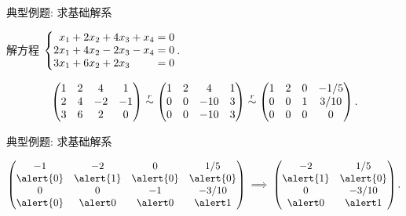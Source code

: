 \begin{frame}{典型例题: 求基础解系}
	\onslide<+->
	\begin{example}
		解方程 $\laeq[rrrrc]{
			x_1  &{}+2x_2 &{}+4x_3 &{}+x_4&{}=0\\
			2x_1 &{}+4x_2 &{}-2x_3 &{}-x_4&{}=0\\
			3x_1 &{}+6x_2 &{}+2x_3 &      &{}=0
		}$.
	\end{example}
	\onslide<+->
	\begin{solution}
		\[\begin{pmatrix}
			1&2&4&1\\
			2&4&-2&-1\\
			3&6&2&0
		\end{pmatrix}\mathrel{\overset{r}{\sim}}\begin{pmatrix}
			1&2&4&1\\
			0&0&-10&3\\
			0&0&-10&3
		\end{pmatrix}\mathrel{\overset{r}{\sim}}\begin{pmatrix}
			1&2&0&-1/5\\
			0&0&1&3/10\\
			0&0&0&0
		\end{pmatrix}.\]
	\end{solution}
\end{frame}


\begin{frame}{典型例题: 求基础解系}
	\onslide<+->
	\begin{solutionc}
		\[\begin{pmatrix}
			-1&-2&0&1/5\\
			\alert{0}&\alert{1}&\alert{0}&\alert{0}\\
			0&0&-1&-3/10\\
			\alert{0}&\alert0&\alert0&\alert1
		\end{pmatrix}\implies\begin{pmatrix}
			-2&1/5\\
			\alert{1}&\alert{0}\\
			0&-3/10\\
			\alert0&\alert1
		\end{pmatrix}.\]
		\onslide<+->{%
			通解为
			\[\begin{pmatrix}
				x_1\\x_2\\x_3\\x_4
			\end{pmatrix}=k_1\begin{pmatrix}
				-2\\1\\0\\0
			\end{pmatrix}+k_2\begin{pmatrix}
				1/5\\0\\-3/10\\1
			\end{pmatrix},\quad k_1,k_2\text{为任意常数}.\]
		}
	\end{solutionc}
\end{frame}


